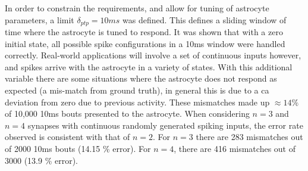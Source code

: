 \documentclass[conference]{IEEEtran}
\newcommand{\ca}{\gls{ca}\textrm{ }}
\newcommand{\eq}[1]{Equation (\ref{#1})}
\begin{document}
In order to constrain the requirements, and allow for tuning of astrocyte
parameters, a limit $\delta_{ptp}=10ms$ was defined. This defines a sliding
window of time where the astrocyte is tuned to respond. It was shown that with a
zero initial state, all possible spike configurations in a 10ms window were
handled correctly. Real-world applications will involve a set of continuous
inputs however, and spikes arrive with the astrocyte in a variety of
states. With this additional variable there are some situations where the
astrocyte does not respond as expected (a mis-match from ground truth), in
general this is due to a \ca deviation from zero due to previous activity. These
mismatches made up $\approx 14\%$ of 10,000 10ms bouts presented to the
astrocyte. When considering $n=3$ and $n=4$ synapses with continuous randomly
generated spiking inputs, the error rate observed is consistent with that of
$n=2$. For $n=3$ there are 283 mismatches out of 2000 10ms bouts (14.15 \%
error). For $n=4$, there are 416 mismatches out of 3000 (13.9 \% error).



\end{document}
